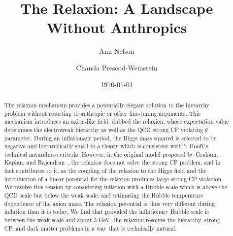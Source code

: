 \documentclass[12pt,aps,prd,showpacs,notitlepage,nofootinbib]{revtex4-1}
\begin{document}
\title{The Relaxion: A Landscape Without Anthropics}
\author{Ann Nelson}
\author{Chanda Prescod-Weinstein}
\date{\today}
\begin{abstract}
The relaxion mechanism provides a potentially elegant solution to the hierarchy problem without resorting to anthropic or other fine-tuning arguments. This mechanism  introduces an axion-like field, dubbed the relaxion, whose expectation value determines the electroweak hierarchy as well as the QCD strong CP violating $\bar{\theta}$ parameter. During an inflationary period,  the Higgs mass squared is selected to be negative and hierarchically small in a theory which is consistent with 't Hooft's technical naturalness criteria. However, in the original model proposed by Graham, Kaplan, and Rajendran~\cite{Graham:2015cka}, the relaxion does not solve the  strong CP problem, and in fact contributes to it, as  the coupling of the relaxion  to the Higgs field and the  introduction of a linear potential for the relaxion produces large strong CP violation. We resolve this tension by considering inflation with a Hubble scale which is above the QCD scale but below the weak scale, and estimating the Hubble temperature dependence of the axion mass. The relaxion potential is thus very different during inflation than it is today. We find that provided the inflationary Hubble scale is between the weak scale and about 3 GeV, the relaxion resolves the hierarchy, strong CP, and dark matter problems in a way that is technically natural.

\end{abstract}
\maketitle
\end{document}
